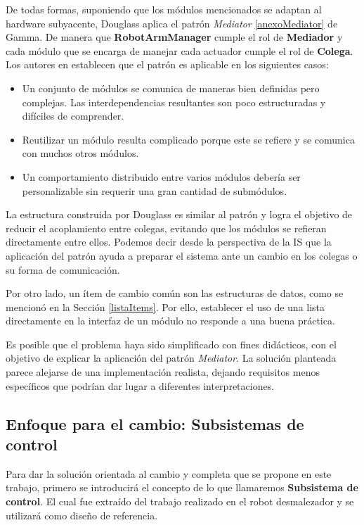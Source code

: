 De todas formas, suponiendo que los módulos mencionados se adaptan al hardware subyacente, Douglass aplica el patrón \textit{Mediator} \ref{anexoMediator} de Gamma. De manera que \textbf{RobotArmManager} cumple el rol de \textbf{Mediador} y cada módulo que se encarga de manejar cada actuador cumple el rol de \textbf{Colega}. Los autores en \cite{Gamma:1995:DPE:186897} establecen que el patrón es aplicable en los siguientes casos:
\begin{itemize}
\item Un conjunto de módulos se comunica de maneras bien definidas pero complejas. Las interdependencias resultantes son poco estructuradas y difíciles de comprender.

\item Reutilizar un módulo resulta complicado porque este se refiere y se comunica con muchos otros módulos.

\item Un comportamiento distribuido entre varios módulos debería ser personalizable sin requerir una gran cantidad de submódulos.
\end{itemize}

La estructura construida por Douglass es similar al patrón y logra el objetivo de reducir el acoplamiento entre colegas, evitando que los módulos se refieran directamente entre ellos. Podemos decir desde la perspectiva de la \gls{IS} que la aplicación del patrón ayuda a preparar el sistema ante un cambio en los colegas o su forma de comunicación.

Por otro lado, un ítem de cambio común son las estructuras de datos, como se mencionó en la Sección \ref{listaItems}. Por ello, establecer el uso de una lista directamente en la interfaz de un módulo no responde a una buena práctica.

Es posible que el problema haya sido simplificado con fines didácticos, con el objetivo de explicar la aplicación del patrón \textit{Mediator}. La solución planteada parece alejarse de una implementación realista, dejando requisitos menos específicos que podrían dar lugar a diferentes interpretaciones.



\subsection*{Enfoque para el cambio: Subsistemas de control}
\label{subsistema}

Para dar la solución orientada al cambio y completa que se propone en este trabajo, primero se introducirá el concepto de lo que llamaremos \textbf{Subsistema de control}. El cual fue extraído del trabajo realizado en el robot desmalezador \cite{paperPomponio} y se utilizará como diseño de referencia.

